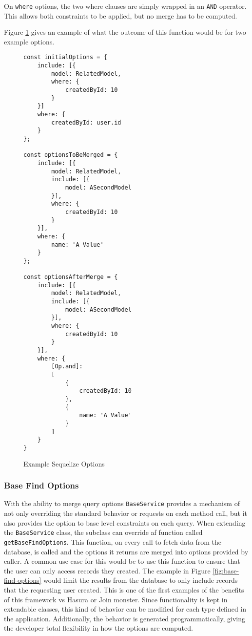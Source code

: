 On \verb!where! options, the two where clauses are simply wrapped in an \verb!AND! operator.  This allows both constraints to be applied, but no merge has to be computed.

Figure \ref{fig:merge-options} gives an example of what the outcome of this function would be for two example options.

\begin{figure}
    \label{fig:merge-options}
    \begin{Verbatim}[fontsize=\footnotesize]
const initialOptions = {
    include: [{
        model: RelatedModel,
        where: {
            createdById: 10
        }
    }]
    where: {
        createdById: user.id
    }
};

const optionsToBeMerged = {
    include: [{
        model: RelatedModel,
        include: [{
            model: ASecondModel
        }],
        where: {
            createdById: 10
        }
    }],
    where: {
        name: 'A Value'
    }
};

const optionsAfterMerge = {
    include: [{
        model: RelatedModel,
        include: [{
            model: ASecondModel
        }],
        where: {
            createdById: 10
        }
    }],
    where: {
        [Op.and]: 
        [
            {
                createdById: 10
            },
            {
                name: 'A Value'
            }
        ]
    }
}
    \end{Verbatim}
    \caption{Example Sequelize Options}
\end{figure}

\subsubsection{Base Find Options}
With the ability to merge query options \verb!BaseService! provides a mechanism of not only overriding the standard behavior or requests on each method call, but it also provides the option to base level constraints on each query.  When extending the \verb!BaseService! class, the subclass can override af function called \verb!getBaseFindOptions!.  This function, on every call to fetch data from the database, is called and the options it returns are merged into options provided by caller.  A common use case for this would be to use this function to ensure that the user can only access records they created.  The example in Figure \ref{fig:base-find-options} would limit the results from the database to only include records that the requesting user created.  This is one of the first examples of the benefits of this framework vs Hasura or Join monster.  Since functionality is kept in extendable classes, this kind of behavior can be modified for each type defined in the application.  Additionally, the behavior is generated programmatically, giving the developer total flexibility in how the options are computed.

